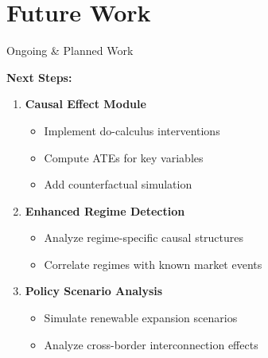 \documentclass[aspectratio=169]{beamer}
\begin{document}
\section{Future Work}

\begin{frame}{Ongoing \& Planned Work}

\textbf{Next Steps:}
\begin{enumerate}
    \item \textbf{Causal Effect Module}
    \begin{itemize}
        \item Implement do-calculus interventions
        \item Compute ATEs for key variables
        \item Add counterfactual simulation
    \end{itemize}

    \item \textbf{Enhanced Regime Detection}
    \begin{itemize}
        \item Analyze regime-specific causal structures
        \item Correlate regimes with known market events
    \end{itemize}

    \item \textbf{Policy Scenario Analysis}
    \begin{itemize}
        \item Simulate renewable expansion scenarios
        \item Analyze cross-border interconnection effects
    \end{itemize}
\end{enumerate}
\end{frame}
\end{document}
